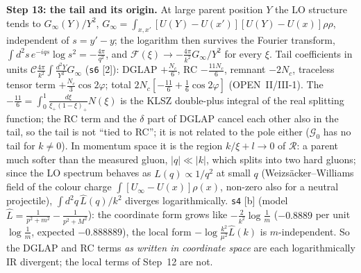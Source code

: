 \documentclass[10pt]{article}
\begin{document}
\noindent\textbf{Step 13: the tail and its origin.} At large parent position $Y$ the LO structure tends to $G_{\infty}(Y)/Y^{2}$, $G_{\infty}=\int_{x,x'}[U(Y)-U(x')][U(Y)-U(x)]\rho\rho$, independent of $s=y'-y$; the logarithm then survives the Fourier transform, $\int d^{2}s\,e^{-iqs}\log s^{2}=-\frac{4\pi}{q^{2}}$, and $\mathcal{F}(\xi)\to-\frac{4\pi}{k^{2}}G_{\infty}/Y^{2}$ for every $\xi$. Tail coefficients in units $\mathcal{C}\frac{4\pi}{k^{2}}\int\frac{d^{2}Y}{Y^{2}}G_{\infty}$ (\texttt{s6} [2]): DGLAP $+\frac{N_{c}}{6}$, RC $-\frac{11N_{c}}{6}$, remnant $-2N_{c}$, traceless tensor term $+\frac{N_{c}}{3}\cos2\varphi$; total $2N_{c}[-\frac{11}{6}+\frac16\cos2\varphi]$ (OPEN~II/III-1). The $-\frac{11}{6}=\int_{0}^{1}\frac{d\xi}{\xi_{+}(1-\xi)_{+}}N(\xi)$ is the KLSZ double-plus integral of the real splitting function; the RC term and the $\delta$ part of DGLAP cancel each other also in the tail, so the tail is not ``tied to RC''; it is not related to the pole either ($\mathcal{G}_{0}$ has no tail for $k\neq0$). In momentum space it is the region $k/\xi+l\to0$ of $\mathcal{R}$: a parent much softer than the measured gluon, $|q|\ll|k|$, which splits into two hard gluons; since the LO spectrum behaves as $\widehat{L}(q)\propto1/q^{2}$ at small $q$ (Weizs\"acker--Williams field of the colour charge $\int[U_{\infty}-U(x)]\rho(x)$, non-zero also for a neutral projectile), $\int d^{2}q\,\widehat{L}(q)/k^{2}$ diverges logarithmically. \texttt{s4} [b] (model $\widehat{L}=\frac{1}{p^{2}+m^{2}}-\frac{1}{p^{2}+M^{2}}$): the coordinate form grows like $-\frac{2}{k^{2}}\log\frac1m$ ($-0.8889$ per unit $\log\frac1m$, expected $-0.888889$), the local form $-\log\frac{k^{2}}{\mu^{2}}\widehat{L}(k)$ is $m$-independent. So the DGLAP and RC terms \emph{as written in coordinate space} are each logarithmically IR divergent; the local terms of Step~12 are not.
\end{document}

